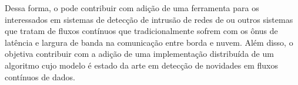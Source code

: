 Dessa forma, o \mfog pode contribuir com adição de uma ferramenta para os interessados
em sistemas de detecção de intrusão de redes de 
ou outros sistemas que tratam de fluxos contínuos que tradicionalmente sofrem
com os ônus de latência e largura de banda na comunicação entre borda e nuvem.
Além disso, o \mfog objetiva contribuir com a adição de uma implementação
distribuída de um algoritmo cujo modelo é estado da arte em detecção de
novidades em fluxos contínuos de dados.





